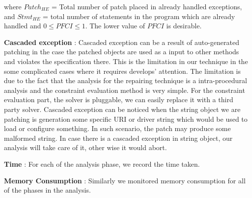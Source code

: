 \begin{mylist}
where $Patch_{HE}$ = Total number of patch placed in already handled exceptions,
and $Stmt_{HE}$ =  total number of statements in the program which are already
handled and $0 \le PFCI \le 1$. The lower value of $PFCI$ is desirable.


\item \textbf{Cascaded exception} : Cascaded exception can be a result of 
auto-generated patching in the case the patched objects are used as a input
to other methods and violates the specification there. This is the limitation
in our technique in the some complicated cases where it requires develops' 
attention. The limitation is due to the fact that the analysis for the repairing 
technique is a intra-procedural analysis and the constraint evaluation method is
very simple. For the constraint evaluation part, the solver is pluggable, we can
easily replace it with a third party solver. Cascaded exception can be noticed 
when the string object we are patching is generation some specific URI or driver
string which would be used to load or configure something. In such scenario, the
patch may produce some malformed string. In case there is a cascaded exception 
in string object, our analysis will take care of it, other wise it would abort. 

\item \textbf{Time} : For each of the analysis phase, we record the time taken.

\item \textbf{Memory Consumption} : Similarly we monitored memory consumption
for all of the phases in the analysis.

\end{mylist}

